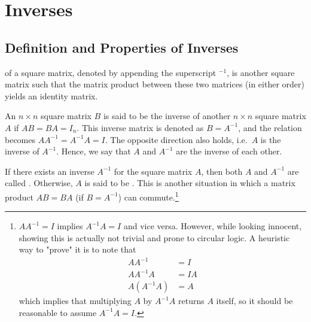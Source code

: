 \section{Inverses}
\label{section:inv}
\subsection{Definition and Properties of Inverses}
\label{subsection:invsub}
 of a square matrix, denoted by appending the superscript $^{-1}$, is another square matrix such that the matrix product between these two matrices (in either order) yields an identity matrix.
\begin{defn}[Inverse]
\label{defn:inverse}
An $n \times n$ square matrix $B$ is said to be the inverse of another $n \times n$ square matrix $A$ if $AB = BA = I_n$. This inverse matrix is denoted as $B = A^{-1}$, and the relation becomes $AA^{-1} = A^{-1}A = I$. The opposite direction also holds, i.e.\ $A$ is the inverse of $A^{-1}$. Hence, we say that $A$ and $A^{-1}$ are the inverse of each other.
\end{defn}
If there exists an inverse $A^{-1}$ for the square matrix $A$, then both $A$ and $A^{-1}$ are called . Otherwise, $A$ is said to be . This is another situation in which a matrix product $AB = BA$ (if $B=A^{-1}$) can commute.\footnote{$AA^{-1} = I$ implies $A^{-1}A = I$ and vice versa. However, while looking innocent, showing this is actually not trivial and prone to circular logic. A heuristic way to "prove" it is to note that
\begin{align*}
AA^{-1} &= I \\
AA^{-1}A &= IA \\
A(A^{-1}A) &= A
\end{align*}
which implies that multiplying $A$ by $A^{-1}A$ returns $A$ itself, so it should be reasonable to assume $A^{-1}A = I$.}\par %
